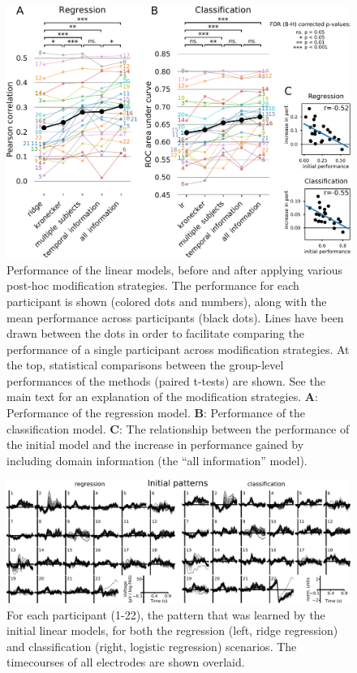 \documentclass[a4paper]{vanvliet_paper}
\begin{document}
\begin{figure}[p]
\centering
\includegraphics[width=13cm]{figures/results.pdf}%
    \caption{Performance of the linear models, before and after applying various post-hoc modification strategies. The performance for each participant is shown (colored dots and numbers), along with the mean performance across participants (black dots). Lines have been drawn between the dots in order to facilitate comparing the performance of a single participant across modification strategies. At the top, statistical comparisons between the group-level performances of the methods (paired t-tests) are shown. See the main text for an explanation of the modification strategies. \textbf{A}: Performance of the regression model. \textbf{B}: Performance of the classification model. \textbf{C}: The relationship between the performance of the initial model and the increase in performance gained by including domain information (the ``all information'' model).}\label{fig:results}
\end{figure}

\begin{figure}[p]
\centering
\includegraphics[width=18cm]{figures/patterns.pdf}
\vspace{2ex}
\caption{For each participant (1-22), the pattern that was learned by the initial linear models, for both the regression (left, ridge regression) and classification (right, logistic regression) scenarios. The timecourses of all electrodes are shown overlaid.}\label{fig:patterns}
\end{figure}
\end{document}

